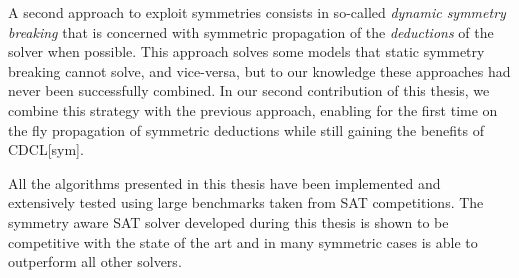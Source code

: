A second approach to exploit symmetries consists in so-called \textit{dynamic symmetry breaking} that
is concerned with symmetric propagation of the \textit{deductions} of the solver when possible.
This approach solves some models that static symmetry breaking cannot solve, and vice-versa,
but to our knowledge these approaches had never been successfully combined. 
In our second contribution of this thesis, we combine this strategy with the previous
approach,  enabling for the first time on the fly propagation of symmetric deductions 
 while still gaining the benefits of CDCL[sym].

All the algorithms presented in this thesis have been implemented and extensively tested using large benchmarks taken from SAT competitions. The symmetry aware SAT solver developed during this thesis is shown to be competitive with the state of the art
and in many symmetric cases is able to outperform all other solvers.



%
%
%
%
